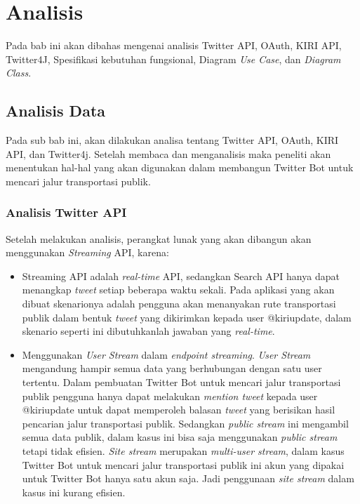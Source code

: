 \chapter{Analisis}
\label{chap:analisis}

Pada bab ini akan dibahas mengenai analisis Twitter API, OAuth, KIRI API, Twitter4J, Spesifikasi kebutuhan fungsional, Diagram \textit{Use Case}, dan \textit{Diagram Class}.

\section{Analisis Data}

Pada sub bab ini, akan dilakukan analisa tentang Twitter API, OAuth, KIRI API, dan Twitter4j. Setelah membaca dan menganalisis maka peneliti akan menentukan hal-hal  yang akan digunakan dalam membangun Twitter Bot untuk mencari jalur transportasi publik.

\subsection{Analisis Twitter API}
Setelah melakukan analisis, perangkat lunak yang akan dibangun akan menggunakan \textit{Streaming} API, karena:
\begin{itemize}
	\item Streaming API adalah \textit{real-time} API, sedangkan Search API hanya dapat menangkap \textit{tweet} setiap beberapa waktu sekali. Pada aplikasi yang akan dibuat skenarionya adalah pengguna akan menanyakan rute transportasi publik dalam bentuk \textit{tweet} yang dikirimkan kepada user @kiriupdate, dalam skenario seperti ini dibutuhkanlah jawaban yang \textit{real-time}.
	\item Menggunakan \textit{User Stream} dalam \textit{endpoint streaming}. \textit{User Stream} mengandung hampir semua data yang berhubungan dengan satu user tertentu. Dalam pembuatan Twitter Bot untuk mencari jalur transportasi publik pengguna hanya dapat melakukan \textit{mention tweet} kepada user @kiriupdate untuk dapat memperoleh balasan \textit{tweet} yang berisikan hasil pencarian jalur transportasi publik. Sedangkan \textit{public stream} ini mengambil semua data publik, dalam kasus ini bisa saja menggunakan \textit{public stream} tetapi tidak efisien. \textit{Site stream} merupakan \textit{multi-user stream}, dalam kasus Twitter Bot untuk mencari jalur transportasi publik ini akun yang dipakai untuk Twitter Bot hanya satu akun saja. Jadi penggunaan \textit{site stream} dalam kasus ini kurang efisien.
\end{itemize}

